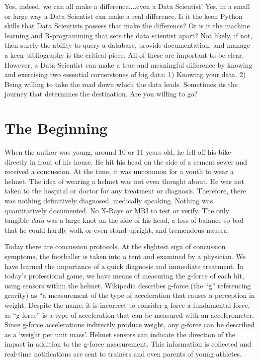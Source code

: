 \documentclass[sigconf]{acmart}
\begin{document}
Yes, indeed, we can all make a difference....even a Data Scientist!  Yes, in a small or large way a Data Scientist can make a real difference.  Ii it the keen Python skills that Data Scientists possess that make the difference?  Or is it the machine learning and R-programming that sets the data scientist apart?  Not likely, if not, then surely the ability to query a database, provide documentation, and manage a keen bibliography is the critical piece.  All of these are important to be clear.  However, a Data Scientist can make a true and meaningful difference by knowing and exercising two essential cornerstones of big data:  1) Knowing your data.  2) Being willing to take the road down which the data leads.  Sometimes its the journey that determines the destination.  Are you willing to go?


\section{The Beginning}

When the author was young, around 10 or 11 years old, he fell off his bike directly in front of his house.  He hit his head on the side of a cement sewer and received a concussion.  At the time, it was uncommon for a youth to wear a helmet.  The idea of wearing a helmet was not even thought about. He was not taken to the hospital or doctor for any treatment or diagnosis.  Therefore, there was nothing definitively diagnosed, medically speaking.   Nothing was quantitatively documented.  No X-Rays or MRI to test or verify. The only tangible {\em data} was a large knot on the side of his head, a loss of balance so bad that he could hardly walk or even stand upright, and tremendous nausea.  

Today there are concussion protocols.  At the slightest sign of concussion symptoms, the footballer is taken into a tent and examined by a physician.  We have learned the importance of a quick diagnosis and immediate treatment.  In today's professional game, we have means of measuring the g-force of each hit, using sensors within the helmet.  Wikipedia describes g-force (the ``g'' referencing gravity) as ``a measurement of the type of acceleration that causes a perception in weight.  Despite the name, it is incorrect to consider g-force a fundamental force, as ``g-force'' is a type of acceleration that can be measured with an accelerometer.  Since g-force accelerations indirectly produce weight, any g-force can be described as a `weight per unit mass'.  Helmet sensors can indicate the direction of the impact in addition to the g-force measurement.  This information is collected and real-time notifications are sent to trainers and even parents of young athletes.  
\end{document}
